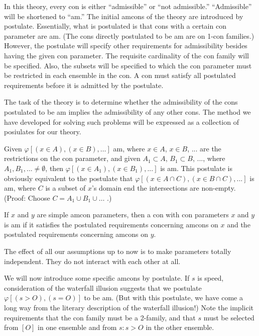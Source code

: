 In this theory, every con is either \enquote{admissible} or \enquote{not admissible.} 
\enquote{Admissible} will be shortened to \enquote{am.} The initial amcons of the theory 
are introduced by postulate. Essentially, what is postulated is that cons with 
a certain con parameter are am. (The cons directly postulated to be am are 
on 1-con families.) However, the postulate will specify other requirements for 
admissibility besides having the given con parameter. The requisite 
cardinality of the con family will be specified. Also, the subsets will be 
specified to which the con parameter must be restricted in each ensemble in 
the con. A con must satisfy all postulated requirements before it is admitted 
by the postulate. 

The task of the theory is to determine whether the admissibility of the 
cons postulated to be am implies the admissibility of any other cons. The 
method we have developed for solving such problems will be expressed as a 
collection of posiulates for our theory. 

 Given $\varphi[(x\in A),(x\in B),\ldots]$ am, where $x\in A$, $x\in B$, ... are the 
restrictions on the con parameter, and given $A_1\subset A$, $B_1\subset B$, ..., where $A_1,B_1,...\neq\emptyset$, then 
$\varphi[(x\in A_1),(x\in B_1),...]$ is am. This postulate is obviously 
equivalent to the postulate that $\varphi[(x\in A\cap C),(x\in B\cap C),...]$ is am, where $C$ is 
a subset of $x$'s domain end the intersections are non-empty. (Proof: Choose 
$C=A_1\cup B_1\cup\ldots$ .) 

 If $x$ and $y$ are simple amcon parameters, then a con with con 
parameters $x$ and $y$ is am if it satisfies the postulated requirements 
concerning amcons on $x$ and the postulated requirements concerning amcons 
on $y$. 

The effect of all our assumptions up to now is to make parameters 
totally independent. They do not interact with each other at all. 

We will now introduce some specific amcons by postulate. If $s$ is speed, 
consideration of the waterfall illusion suggests that we postulate 
$\varphi[(s>O),(s=O)]$ to be am. (But with this postulate, we have come a long way from 
the literary description of the waterfall illusion!) Note the implicit 
requirements that the con family must be a 2-family, and that $s$ must be 
selected from $[O]$ in one ensemble and from ${s:s>O}$ in the other ensemble. 

